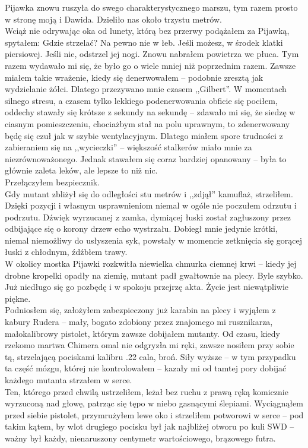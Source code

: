 \documentclass[../MAIN.tex]{subfiles}
\begin{document}
Pijawka znowu ruszyła do swego charakterystycznego marszu, tym razem prosto w stronę moją i Dawida. Dzieliło nas około trzystu metrów.\\
Wciąż nie odrywając oka od lunety, którą bez przerwy podążałem za Pijawką, spytałem:
\sx Gdzie strzelać?
\xx Na pewno nie w łeb. Jeśli możesz, w środek klatki piersiowej. Jeśli nie, odstrzel jej nogi.
\qd
Znowu nabrałem powietrza we płuca. Tym razem wydawało mi się, że było go o wiele mniej niż poprzednim razem. Zawsze miałem takie wrażenie, kiedy się denerwowałem -- podobnie zresztą jak wydzielanie żółci. Dlatego przezywano mnie czasem ,,Gilbert''. W momentach silnego stresu, a czasem tylko lekkiego podenerwowania obficie się pociłem, oddechy stawały się krótsze z sekundy na sekundę -- zdawało mi się, że siedzę w ciasnym pomieszczeniu, chociażbym stał na polu uprawnym, to zdenerwowany będę się czuł jak w szybie wentylacyjnym. Dlatego miałem spore trudności z zabieraniem się na ,,wycieczki'' -- większość stalkerów miało mnie za niezrównoważonego. Jednak stawałem się coraz bardziej opanowany -- była to głównie zaleta leków, ale lepsze to niż nic.
\\
Przełączyłem bezpiecznik.
\\
Gdy mutant zbliżył się do odległości stu metrów i ,,zdjął'' kamuflaż, strzeliłem.
\\
Dzięki pozycji i własnym usprawnieniom niemal w ogóle nie poczułem odrzutu i podrzutu. Dźwięk wyrzucanej z zamka, dymiącej łuski został zagłuszony przez odbijające się o korony drzew echo wystrzału. Dobiegł mnie jedynie krótki, niemal niemożliwy do usłyszenia syk, powstały w momencie zetknięcia się gorącej łuski z chłodnym, źdźbłem trawy.
\\
W okolicy mostka Pijawki rozkwitła niewielka chmurka ciemnej krwi -- kiedy jej drobne kropelki opadły na ziemię, mutant padł gwałtownie na plecy.
\sx Byle szybko.
\qd
Już niedługo się go pozbędę i w spokoju przejrzę akta. Życie jest niewątpliwie piękne.
\\
Podniosłem się, założyłem zabezpieczony już karabin na plecy i wyjąłem z kabury Rudera -- mały, bogato zdobiony przez znajomego mi rusznikarza, małokalibrowy pistolet, którym zawsze dobijałem mutanty. Od czasu, kiedy rzekomo martwa Chimera omal nie odgryzła mi ręki, zawsze nosiłem przy sobie tą, strzelającą pociskami kalibru .22 cala, broń. Siły wyższe -- w tym przypadku ta część mózgu, której nie kontrolowałem -- kazały mi od tamtej pory dobijać każdego mutanta strzałem w serce.
\\
Ten, którego przed chwilą ustrzeliłem, leżał bez ruchu z prawą ręką komicznie wyrzuconą nad głowę, patrząc się tępo w niebo gasnącymi ślepiami. Wyciągnąłem przed siebie pistolet, przymrużyłem lewe oko i strzeliłem potworowi w serce -- pod takim kątem, by wlot drugiego pocisku był jak najbliżej otworu po kuli SWD -- ważny był każdy, nienaruszony centymetr wartościowego, brązowego futra.
\end{document}
